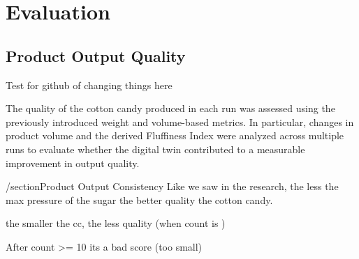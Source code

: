 \chapter{Evaluation}
\label{sec:evaluation}

\section{Product Output Quality}

Test for github of changing things here


The quality of the cotton candy produced in each run was assessed using the previously introduced weight and volume-based metrics. In particular, changes in product volume and the derived Fluffiness Index were analyzed across multiple runs to evaluate whether the digital twin contributed to a measurable improvement in output quality.


/section{Product Output Consistency}
Like we saw in the research, the less the max pressure of the sugar the better quality the cotton candy.

the smaller the cc, the less quality (when count is )

After count >= 10 its a bad score (too small)